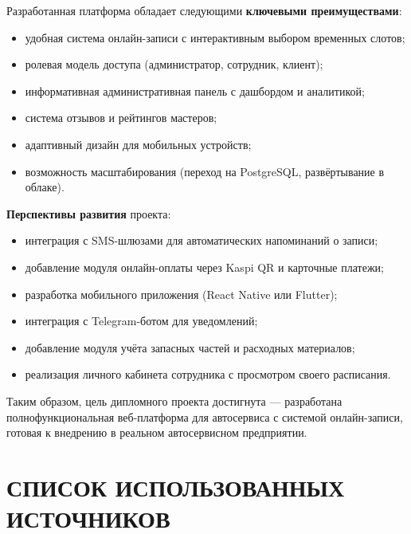 \documentclass[14pt,a4paper,oneside]{extarticle}
\begin{document}
Разработанная платформа обладает следующими \textbf{ключевыми преимуществами}:
\begin{itemize}[leftmargin=2cm]
    \item удобная система онлайн-записи с интерактивным выбором временных слотов;
    \item ролевая модель доступа (администратор, сотрудник, клиент);
    \item информативная административная панель с дашбордом и аналитикой;
    \item система отзывов и рейтингов мастеров;
    \item адаптивный дизайн для мобильных устройств;
    \item возможность масштабирования (переход на PostgreSQL, развёртывание в облаке).
\end{itemize}

\textbf{Перспективы развития} проекта:
\begin{itemize}[leftmargin=2cm]
    \item интеграция с SMS-шлюзами для автоматических напоминаний о записи;
    \item добавление модуля онлайн-оплаты через Kaspi QR и карточные платежи;
    \item разработка мобильного приложения (React Native или Flutter);
    \item интеграция с Telegram-ботом для уведомлений;
    \item добавление модуля учёта запасных частей и расходных материалов;
    \item реализация личного кабинета сотрудника с просмотром своего расписания.
\end{itemize}

Таким образом, цель дипломного проекта достигнута --- разработана полнофункциональная веб-платформа для автосервиса с системой онлайн-записи, готовая к внедрению в реальном автосервисном предприятии.


\newpage
\section*{СПИСОК ИСПОЛЬЗОВАННЫХ ИСТОЧНИКОВ}
\end{document}
